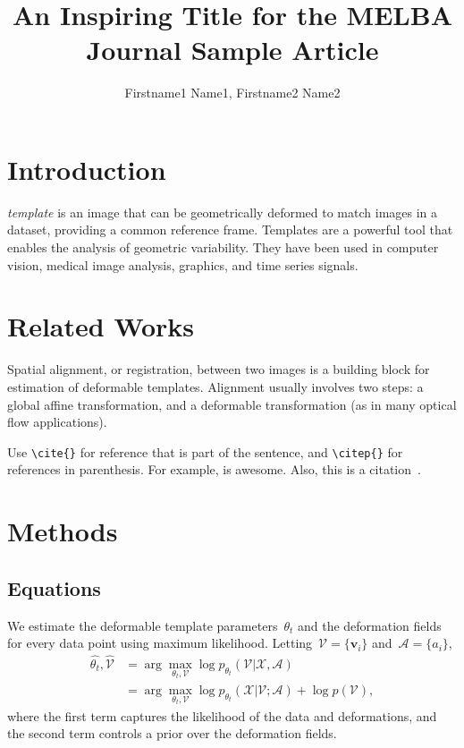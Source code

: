 \documentclass{melba}
\title{An Inspiring Title for the MELBA Journal Sample Article}
\author{
	\firstname Firstname1 \surname Name1\aff{1,3},
	\name Firstname2 Name2\aff{2,3}\orcid{0000-1111-2222-3333}
}
\begin{document}
\twocolumn[\maketitle]

\section{Introduction}
	 \emph{template} is an image that can be geometrically deformed to match images in a dataset, providing a common reference frame. Templates are a powerful tool that enables the analysis of geometric variability. They have been used in computer vision, medical image analysis, graphics, and time series signals.


\section{Related Works}
	Spatial alignment, or registration, between two images is a building block for estimation of deformable templates. Alignment usually involves two steps: a global affine transformation, and a deformable transformation (as in many optical flow applications).

	Use \verb|\cite{}| for reference that is part of the sentence, and \verb|\citep{}| for references in parenthesis. For example, \cite{viola1997alignment} is awesome. Also, this is a citation~\citep{viola1997alignment}.



\section{Methods}
	\subsection{Equations}
		We estimate the deformable template parameters~$\theta_t$ and the deformation fields for every data point using maximum likelihood. Letting~$\mathcal{V} = \{\boldsymbol{v}_i\}$ and~$\mathcal{A} = \{a_i\}$,
		\begin{align}
			\hat{\theta_t}, \hat{\mathcal{V}} &= \arg \max_{\theta_t, \mathcal{V}} \log p_{\theta_t}(\mathcal{V} | \mathcal{X},  \mathcal{A}) \nonumber \\
			&= \arg \max_{\theta_t, \mathcal{V}} \log p_{\theta_t}(\mathcal{X} | \mathcal{V}; \mathcal{A}) + \log p(\mathcal{V}),
			\label{eq:logpost}
		\end{align}
		where the first term captures the likelihood of the data and deformations, and the second term controls a prior over the deformation fields.
\end{document}

